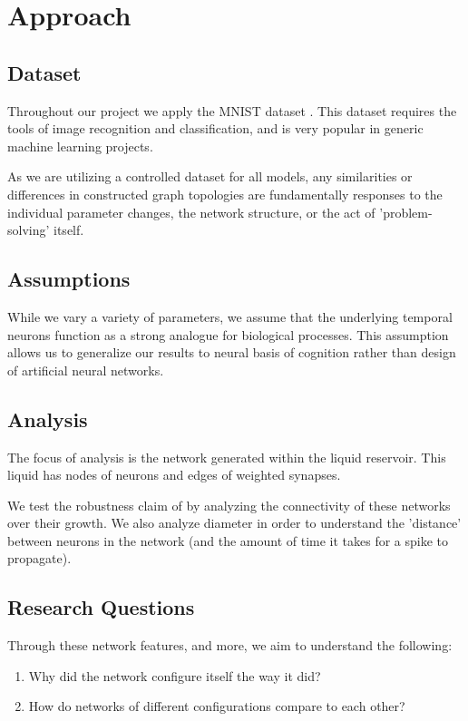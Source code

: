 \section{Approach} \label{sec:Approach}

\subsection{Dataset}

Throughout our project we apply the MNIST dataset \cite{MNIST Dataset}. This
dataset requires the tools of image recognition and classification, and is very
popular in generic machine learning projects.

As we are utilizing a controlled dataset for all models, any similarities or
differences in constructed graph topologies are fundamentally responses to the
individual parameter changes, the network structure, or the act of
'problem-solving' itself.

\subsection{Assumptions}

While we vary a variety of parameters, we assume that the underlying temporal
neurons function as a strong analogue for biological processes. This assumption
allows us to generalize our results to neural basis of cognition rather than
design of artificial neural networks.

\subsection{Analysis}

The focus of analysis is the network generated within the liquid reservoir. This
liquid has nodes of neurons and edges of weighted synapses.

We test the robustness claim of \cite{LSM Constraints} by analyzing the
connectivity of these networks over their growth. We also analyze diameter in
order to understand the 'distance' between neurons in the network (and the
amount of time it takes for a spike to propagate).

\subsection{Research Questions}

Through these network features, and more, we aim to understand the following:

\begin{enumerate}
    \item Why did the network configure itself the way it did?
    \item How do networks of different configurations compare to each other?
\end{enumerate}